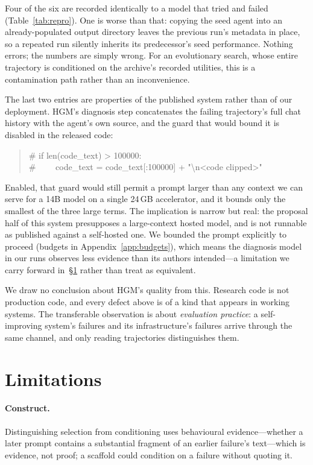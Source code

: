 \documentclass{article}
\begin{document}
Four of the six are recorded identically to a model that tried and failed
(Table~\ref{tab:repro}). One is worse than that: copying the seed agent into
an already-populated output directory leaves the previous run's metadata in
place, so a repeated run silently inherits its predecessor's seed
performance. Nothing errors; the numbers are simply wrong. For an
evolutionary search, whose entire trajectory is conditioned on the archive's
recorded utilities, this is a contamination path rather than an inconvenience.

The last two entries are properties of the published system rather than of our
deployment. HGM's diagnosis step concatenates the failing trajectory's full
chat history with the agent's own source, and the guard that would bound it is
disabled in the released code:

\begin{quote}\ttfamily\footnotesize
\# if len(code\_text) > 100000:\\
\# \ \ \ \ code\_text = code\_text[:100000] + "\textbackslash n<code clipped>"
\end{quote}

Enabled, that guard would still permit a prompt larger than any context we can
serve for a 14B model on a single 24\,GB accelerator, and it bounds only the
smallest of the three large terms. The implication is narrow but real: the
proposal half of this system presupposes a large-context hosted model, and is
not runnable as published against a self-hosted one. We bounded the prompt
explicitly to proceed (budgets in Appendix~\ref{app:budgets}), which means
the diagnosis model in our runs observes less evidence than its authors
intended---a limitation we carry forward in~\S\ref{sec:limitations} rather
than treat as equivalent.

We draw no conclusion about HGM's quality from this. Research code is not
production code, and every defect above is of a kind that appears in working
systems. The transferable observation is about \emph{evaluation practice}: a
self-improving system's failures and its infrastructure's failures arrive
through the same channel, and only reading trajectories distinguishes them.

\section{Limitations}
\label{sec:limitations}

\paragraph{Construct.} Distinguishing selection from conditioning uses
behavioural evidence---whether a later prompt contains a substantial fragment of
an earlier failure's text---which is evidence, not proof; a scaffold could
condition on a failure without quoting it.
\end{document}
